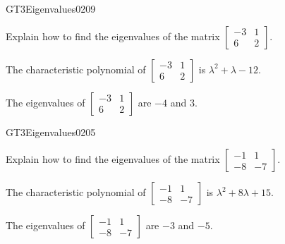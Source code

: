 \newpage




\begin{exercise}{GT3}{Eigenvalues}{0209} 
\begin{exerciseStatement} 

Explain how to find the eigenvalues of the matrix \(\left[\begin{array}{cc}
-3 & 1 \\
6 & 2
\end{array}\right]\).

 \end{exerciseStatement}
 \begin{exerciseAnswer} 

The characteristic polynomial of \(\left[\begin{array}{cc}
-3 & 1 \\
6 & 2
\end{array}\right]\) is \(\lambda^{2} + \lambda - 12\).

 

The eigenvalues of \(\left[\begin{array}{cc}
-3 & 1 \\
6 & 2
\end{array}\right]\) are \(-4\) and \(3\).

 \end{exerciseAnswer}
 \end{exercise}



\begin{exercise}{GT3}{Eigenvalues}{0205} 
\begin{exerciseStatement} 

Explain how to find the eigenvalues of the matrix \(\left[\begin{array}{cc}
-1 & 1 \\
-8 & -7
\end{array}\right]\).

 \end{exerciseStatement}
 \begin{exerciseAnswer} 

The characteristic polynomial of \(\left[\begin{array}{cc}
-1 & 1 \\
-8 & -7
\end{array}\right]\) is \(\lambda^{2} + 8 \lambda + 15\).

 

The eigenvalues of \(\left[\begin{array}{cc}
-1 & 1 \\
-8 & -7
\end{array}\right]\) are \(-3\) and \(-5\).

 \end{exerciseAnswer}
 \end{exercise}


